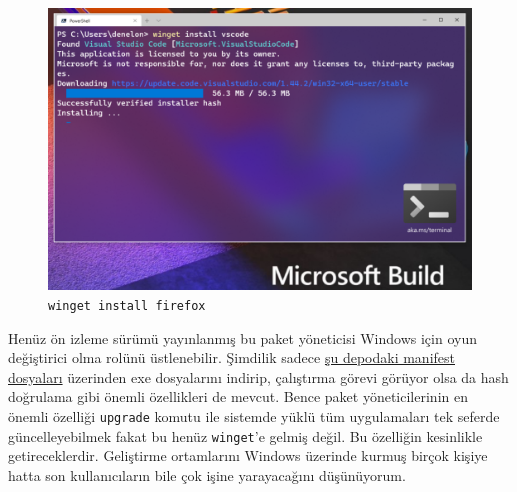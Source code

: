 \documentclass[11pt]{article}
\begin{document}
\begin{figure}[htbp]
\centering
\includegraphics[width=.9\linewidth]{gorseller/winget-install.png}
\caption[\texttt{winget install firefox}]{\texttt{winget install firefox}}
\end{figure}
\newpage

Henüz ön izleme sürümü yayınlanmış bu paket yöneticisi Windows için oyun
değiştirici olma rolünü üstlenebilir. Şimdilik sadece \href{https://github.com/microsoft/winget-pkgs}{şu depodaki manifest
dosyaları} üzerinden exe dosyalarını indirip, çalıştırma görevi görüyor olsa da
hash doğrulama gibi önemli özellikleri de mevcut. Bence paket yöneticilerinin
en önemli özelliği \texttt{upgrade} komutu ile sistemde yüklü tüm uygulamaları tek
seferde güncelleyebilmek fakat bu henüz \texttt{winget}'e gelmiş değil. Bu özelliğin
kesinlikle getireceklerdir. Geliştirme ortamlarını Windows üzerinde kurmuş
birçok kişiye hatta son kullanıcıların bile çok işine yarayacağını
düşünüyorum.
\end{document}
